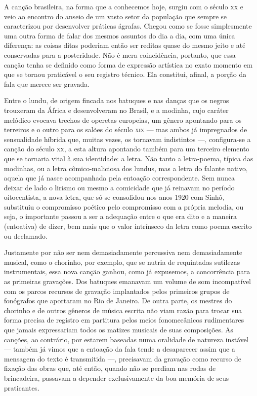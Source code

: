 A canção brasileira, na forma que a conhecemos hoje, surgiu com o século
\textsc{xx} e veio ao encontro do anseio de um vasto setor da população que
sempre se caracterizou por desenvolver práticas ágrafas. Chegou como se
fosse simplesmente uma outra forma de falar dos mesmos assuntos do dia a
dia, com uma única diferença: as coisas ditas poderiam então ser reditas
quase do mesmo jeito e até conservadas para a posteridade. Não é mera
coincidência, portanto, que essa canção tenha se definido como forma de
expressão artística no exato momento em que se tornou praticável o seu
registro técnico. Ela constitui, afinal, a porção da fala que merece ser
gravada.

Entre o lundu, de origem fincada nos batuques e nas danças que os negros
trouxeram da África e desenvolveram no Brasil, e a modinha, cujo caráter
melódico evocava trechos de operetas europeias, um gênero apontando para
os terreiros e o outro para os salões do século \textsc{xix} --- mas ambos já
impregnados de sensualidade híbrida que, muitas vezes, os tornavam
indistintos ---, configura-se a canção do século \textsc{xx}, a esta altura
apontando também para um terceiro elemento que se tornaria vital à sua
identidade: a letra. Não tanto a letra-poema, típica das modinhas, ou a
letra cômico-maliciosa dos lundus, mas a letra do falante nativo, aquela
que já nasce acompanhada pela entoação correspondente. Sem nunca deixar
de lado o lirismo ou mesmo a comicidade que já reinavam no período
oitocentista, a nova letra, que só se consolidou nos anos 1920 com
Sinhô, substituiu o compromisso poético pelo compromisso com a própria
melodia, ou seja, o importante passou a ser a adequação entre o que era
dito e a maneira (entoativa) de dizer, bem mais que o valor intrínseco
da letra como poema escrito ou declamado.

Justamente por não ser nem demasiadamente percussiva nem demasiadamente
musical, como o chorinho, por exemplo, que se nutria de requintadas
sutilezas instrumentais, essa nova canção ganhou, como já expusemos, a
concorrência para as primeiras gravações. Dos batuques emanavam um
volume de som incompatível com os parcos recursos de gravação
implantados pelos primeiros grupos de fonógrafos que aportaram no Rio de
Janeiro. De outra parte, os mestres do chorinho e de outros gêneros de
música escrita não viam razão para trocar sua forma precisa de registro
em partitura pelos meios fonomecânicos rudimentares que jamais
expressariam todos os matizes musicais de suas composições. As canções,
ao contrário, por estarem baseadas numa oralidade de natureza instável
 --- também já vimos que a entoação da fala tende a desaparecer assim que a
mensagem do texto é transmitida ---, precisavam da gravação como recurso de
fixação das obras que, até então, quando não se perdiam nas rodas de
brincadeira, passavam a depender exclusivamente da boa memória de seus
praticantes.

